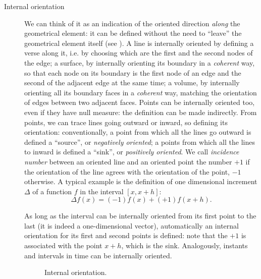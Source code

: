 \begin{description}
\item[Internal orientation] We can think of it as an indication of the
  oriented direction \emph{along} the geometrical element: it can be
  defined without the need to ``leave'' the geometrical element
  itself (see ). A line is internally
  oriented by defining a verse along it, i.e. by
  choosing which are the first and the second nodes of the edge; a
  surface, by internally orienting its boundary in a \emph{coherent}
  way, so that each node on its boundary is the first node of an edge
  and the second of the adjacent edge at the same time; a volume, by
  internally orienting all its boundary faces in a \emph{coherent}
  way, matching the orientation of edges between two adjacent
  faces. Points can be internally oriented too, even if they have null
  measure: the definition can be made indirectly. From points, we can
  trace lines going outward or inward, so defining its orientation:
  conventionally, a point from which all the lines go outward is
  defined a ``source'', or \emph{negatively oriented}; a points from
  which all the lines to inward is defined a ``sink'', or
  \emph{positively oriented}. We call \emph{incidence number} between
  an oriented line and an oriented point the number $+1$ if the
  orientation of the line agrees with the orientation of the point,
  $-1$ otherwise. A typical example is the definition of one
  dimensional increment $\Delta$ of a function $f$ in the interval
  $[x,x+h]$:
  \begin{equation*}
    \Delta f(x) = (-1) f(x) + (+1) f(x+h).
  \end{equation*}
  
  As long as the interval can be internally oriented from its first
  point to the last (it is indeed a one-dimensional vector),
  automatically an internal orientation for its first and second
  points is defined: note that the $+1$ is associated with the point
  $x+h$, which is the sink. Analogously, instants and intervals in
  time can be internally oriented.

  \begin{figure}[htbp]
    \begin{center}
      \subfigure[Point]{\resizebox{4cm}{!}{}}
      \subfigure[Line]{\resizebox{4cm}{!}{}}
      \subfigure[Face]{\resizebox{4cm}{!}{}}
      \subfigure[Volume]{\resizebox{4cm}{!}{}}
  \end{center}
    \caption{Internal orientation.}
    \label{fig:internal_orientation}
  \end{figure}
  

\end{description}
